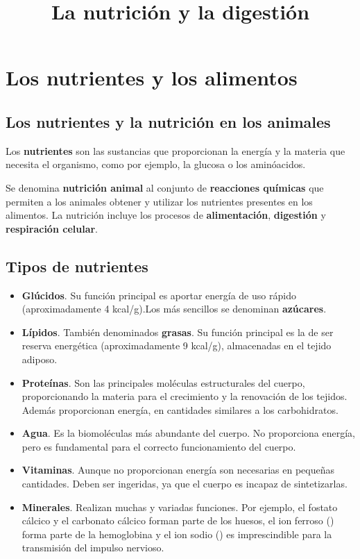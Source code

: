 \documentclass{article}
\title{La nutrición y la digestión}
\begin{document}
	\maketitle
	
	\section{Los nutrientes y los alimentos}
	
		\subsection{Los nutrientes y la nutrición en los animales}
	
			Los \textbf{nutrientes} son las sustancias que proporcionan la energía y la materia que necesita el organismo, como por ejemplo, la glucosa o los aminóacidos. \par
			Se denomina \textbf{nutrición animal} al conjunto de \textbf{reacciones químicas} que permiten a los animales obtener y utilizar los nutrientes presentes en los alimentos. La nutrición incluye los procesos de \textbf{alimentación}, \textbf{digestión} y \textbf{respiración celular}.
	
		\subsection{Tipos de nutrientes}
	
			\begin{itemize}
				\item \textbf{Glúcidos}. Su función principal es aportar energía de uso rápido (aproximadamente 4 kcal/g).Los más sencillos se denominan \textbf{azúcares}.
				\item \textbf{Lípidos}. También denominados \textbf{grasas}. Su función principal es la de ser reserva energética (aproximadamente 9 kcal/g), almacenadas en el tejido adiposo. 
				\item \textbf{Proteínas}. Son las principales moléculas estructurales del cuerpo, proporcionando la materia para el crecimiento y la renovación de los tejidos. Además proporcionan energía, en cantidades similares a los carbohidratos.
				\item \textbf{Agua}. Es la biomoléculas más abundante del cuerpo. No proporciona energía, pero es fundamental para el correcto funcionamiento del cuerpo. 
				\item \textbf{Vitaminas}. Aunque no proporcionan energía son necesarias en pequeñas cantidades. Deben ser ingeridas, ya que el cuerpo es incapaz de sintetizarlas.
				\item \textbf{Minerales}. Realizan muchas y variadas funciones. Por ejemplo, el fostato cálcico y el carbonato cálcico forman parte de los huesos, el ion ferroso () forma parte de la hemoglobina y el ion sodio () es imprescindible para la transmisión del impulso nervioso.
			\end{itemize}
			
\end{document}
